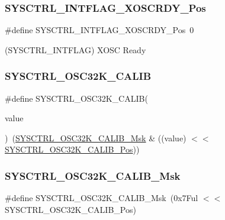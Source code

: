 \subsubsection{\texorpdfstring{SYSCTRL\_INTFLAG\_XOSCRDY\_Pos}{SYSCTRL\_INTFLAG\_XOSCRDY\_Pos}}
{\footnotesize\ttfamily \#define S\+Y\+S\+C\+T\+R\+L\+\_\+\+I\+N\+T\+F\+L\+A\+G\+\_\+\+X\+O\+S\+C\+R\+D\+Y\+\_\+\+Pos~0}



(S\+Y\+S\+C\+T\+R\+L\+\_\+\+I\+N\+T\+F\+L\+AG) X\+O\+SC Ready 

\mbox{\label{group___s_a_m_d21___s_y_s_c_t_r_l_ga42bacb065e446caf85452158e6d152d3}} 
\subsubsection{\texorpdfstring{SYSCTRL\_OSC32K\_CALIB}{SYSCTRL\_OSC32K\_CALIB}}
{\footnotesize\ttfamily \#define S\+Y\+S\+C\+T\+R\+L\+\_\+\+O\+S\+C32\+K\+\_\+\+C\+A\+L\+IB(\begin{DoxyParamCaption}\item[{}]{value }\end{DoxyParamCaption})~(\mbox{\hyperlink{group___s_a_m_d21___s_y_s_c_t_r_l_ga1b9d49b20b2a6d6c4041cb1ef587145f}{S\+Y\+S\+C\+T\+R\+L\+\_\+\+O\+S\+C32\+K\+\_\+\+C\+A\+L\+I\+B\+\_\+\+Msk}} \& ((value) $<$$<$ \mbox{\hyperlink{group___s_a_m_d21___s_y_s_c_t_r_l_ga74dac230358c09321dd6c6a64462bde5}{S\+Y\+S\+C\+T\+R\+L\+\_\+\+O\+S\+C32\+K\+\_\+\+C\+A\+L\+I\+B\+\_\+\+Pos}}))}

\mbox{\label{group___s_a_m_d21___s_y_s_c_t_r_l_ga1b9d49b20b2a6d6c4041cb1ef587145f}} 
\subsubsection{\texorpdfstring{SYSCTRL\_OSC32K\_CALIB\_Msk}{SYSCTRL\_OSC32K\_CALIB\_Msk}}
{\footnotesize\ttfamily \#define S\+Y\+S\+C\+T\+R\+L\+\_\+\+O\+S\+C32\+K\+\_\+\+C\+A\+L\+I\+B\+\_\+\+Msk~(0x7\+Ful $<$$<$ S\+Y\+S\+C\+T\+R\+L\+\_\+\+O\+S\+C32\+K\+\_\+\+C\+A\+L\+I\+B\+\_\+\+Pos)}

